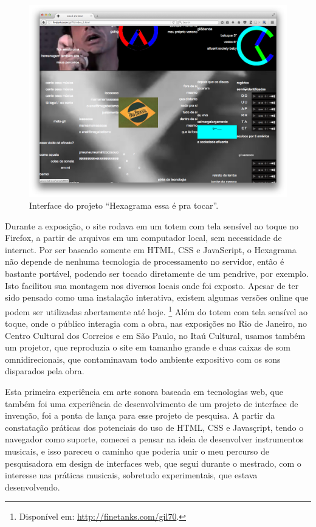 \begin{figure}

\includegraphics[width=1\textwidth]{pictures/cap1/gil702}
\caption{Interface do projeto ``Hexagrama essa é pra tocar''.}
\label{fig:gil702}
\end{figure}

Durante a exposição, o site rodava em um totem com tela sensível ao toque no Firefox, a partir de arquivos em um computador local, sem necessidade de internet. Por ser baseado somente em HTML, CSS e JavaScript, o Hexagrama não depende de nenhuma tecnologia de processamento no servidor, então é bastante portável, podendo ser tocado diretamente de um pendrive, por exemplo. Isto facilitou sua montagem nos diversos locais onde foi exposto. Apesar de ter sido pensado como uma instalação interativa, existem algumas versões online que podem ser utilizadas abertamente até hoje. \footnote{Disponível em: \url{http://finetanks.com/gil70}.}
Além do totem com tela sensível ao toque, onde o público interagia com a obra, nas exposições no Rio de Janeiro, no Centro Cultural dos Correios e em São Paulo, no Itaú Cultural, usamos também um projetor, que reproduzia o site em tamanho grande e duas caixas de som omnidirecionais, que contaminavam todo ambiente expositivo com os sons disparados pela obra.

Esta primeira experiência em arte sonora baseada em tecnologias web, que também foi uma experiência de desenvolvimento de um projeto de interface de invenção, foi a ponta de lança para esse projeto de pesquisa. A partir da constatação práticas dos potenciais do uso de HTML, CSS e Javasçript, tendo o navegador como suporte, comecei a pensar na ideia de desenvolver instrumentos musicais, e isso pareceu o caminho que poderia unir o meu percurso de pesquisadora em design de interfaces web, que segui durante o mestrado, com o interesse nas práticas musicais, sobretudo experimentais, que estava desenvolvendo.


\newpage